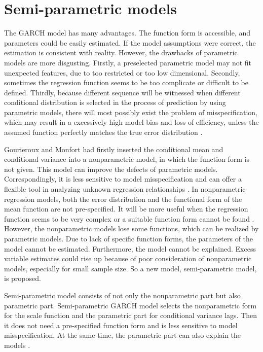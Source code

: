 \chapter{Semi-parametric models}\label{semiparaGarch}

The GARCH model has many advantages. The function form is accessible, and parameters could be easily estimated. If the model assumptions were correct, the estimation is consistent with reality. However, the drawbacks of parametric models are more disgusting. Firstly, a preselected parametric model may not fit unexpected features, due to too restricted or too low dimensional. Secondly, sometimes the regression function seems to be too complicate or difficult to be defined. Thirdly, because different sequence will be witnessed when different conditional distribution is selected in the process of prediction by using parametric models, there will most possibly exist the problem of misspecification, which may result in a excessively high model bias and loss of efficiency, unless the assumed function perfectly matches the true error distribution \citep{Di2011}.

Gourieroux and Monfort had firstly inserted the conditional mean and conditional variance into a nonparametric model, in which the function form is not given.  This model can improve the defects of parametric models. Correspondingly, it is less sensitive to model misspecification and can offer a flexible tool in analyzing unknown regression relationships 
\citep{Gourieroux1992}. In nonparametric regression models, both the error distribution and the functional form of the mean function are not pre-specified. It will be more useful when the regression function seems to be very complex or a suitable function form cannot be found \citep{Eubank1993}. However, the nonparametric models lose some functions, which can be realized by parametric models. Due to lack of specific function forms, the parameters of the model cannot be estimated. Furthermore, the model cannot be explained. Excess variable estimates could rise up because of poor consideration of nonparametric models, especially for small sample size. So a new model, semi-parametric model, is proposed.

Semi-parametric model consists of not only the nonparametric part but also parametric part. Semi-parametric GARCH model selects the nonparametric form for the scale function and the parametric part for conditional variance lags. Then it does not need a pre-specified function form and is less sensitive to model misspecification. At the same time, the parametric part can also explain the models \citep{Di2011}.

